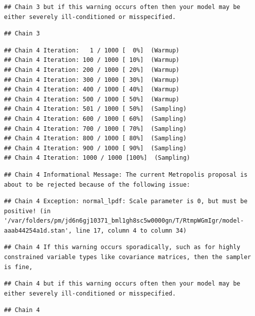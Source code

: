 \documentclass[
]{book}
\begin{document}
\begin{verbatim}
## Chain 3 but if this warning occurs often then your model may be either severely ill-conditioned or misspecified.
\end{verbatim}

\begin{verbatim}
## Chain 3
\end{verbatim}

\begin{verbatim}
## Chain 4 Iteration:   1 / 1000 [  0%]  (Warmup) 
## Chain 4 Iteration: 100 / 1000 [ 10%]  (Warmup) 
## Chain 4 Iteration: 200 / 1000 [ 20%]  (Warmup) 
## Chain 4 Iteration: 300 / 1000 [ 30%]  (Warmup) 
## Chain 4 Iteration: 400 / 1000 [ 40%]  (Warmup) 
## Chain 4 Iteration: 500 / 1000 [ 50%]  (Warmup) 
## Chain 4 Iteration: 501 / 1000 [ 50%]  (Sampling) 
## Chain 4 Iteration: 600 / 1000 [ 60%]  (Sampling) 
## Chain 4 Iteration: 700 / 1000 [ 70%]  (Sampling) 
## Chain 4 Iteration: 800 / 1000 [ 80%]  (Sampling) 
## Chain 4 Iteration: 900 / 1000 [ 90%]  (Sampling) 
## Chain 4 Iteration: 1000 / 1000 [100%]  (Sampling)
\end{verbatim}

\begin{verbatim}
## Chain 4 Informational Message: The current Metropolis proposal is about to be rejected because of the following issue:
\end{verbatim}

\begin{verbatim}
## Chain 4 Exception: normal_lpdf: Scale parameter is 0, but must be positive! (in '/var/folders/pm/jd6n6gj10371_bml1gh8sc5w0000gn/T/RtmpWGmIgr/model-aaab44254a1d.stan', line 17, column 4 to column 34)
\end{verbatim}

\begin{verbatim}
## Chain 4 If this warning occurs sporadically, such as for highly constrained variable types like covariance matrices, then the sampler is fine,
\end{verbatim}

\begin{verbatim}
## Chain 4 but if this warning occurs often then your model may be either severely ill-conditioned or misspecified.
\end{verbatim}

\begin{verbatim}
## Chain 4
\end{verbatim}
\end{document}
